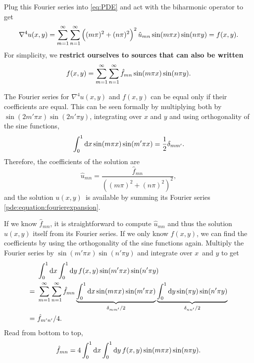 Plug this Fourier series into \cref{eq:PDE} and act with the biharmonic operator to get
\begin{equation*}
\nabla^4 u(x,y) = \sum_{m=1}^{\infty} \sum_{n=1}^{\infty} \left((m\pi)^2+(n\pi)^2\right)^2 \hat{u}_{mn} \sin(m \pi x) \sin(n \pi y) = f(x,y).
\end{equation*}
For simplicity, we \textbf{restrict ourselves to sources that can also be written}
\begin{equation}
	f(x,y) = \sum_{m=1}^{\infty} \sum_{n=1}^{\infty} \hat{f}_{mn} \sin(m \pi x) \sin(n \pi y).
\end{equation}

The Fourier series for $\nabla^4 u(x,y)$ and $f(x,y)$ can be equal only if their coefficients are equal.
This can be seen formally by multiplying both by $\sin(2m'\pi x) \sin(2n'\pi y)$, integrating over $x$ and $y$ and using orthogonality of the sine functions,
\begin{equation*}
	\integral{\sin(m\pi x) \sin(m' \pi x)}{x}{0}{1} = \frac{1}{2} \delta_{mm'}.
\end{equation*}
Therefore, the coefficients of the solution are
\begin{equation}
	\hat{u}_{mn} = \frac{\hat{f}_{mn}}{\left((m\pi)^2+(n\pi)^2\right)^2},
\end{equation}
and the solution $u(x,y)$ is available by summing its Fourier series \ref{pde:equation:fourierexpansion}.

If we know $\hat{f}_{mn}$, it is straightforward to compute $\hat{u}_{mn}$ and thus the solution $u(x,y)$ itself from its Fourier series.
If we only know $f(x,y)$, we can find the coefficients by using the orthogonality of the sine functions again.
Multiply the Fourier series by $\sin(m' \pi x) \sin(n' \pi y)$ and integrate over $x$ and $y$ to get
\begin{equation*}
\begin{split}
  & \,\, \integraltwo{f(x,y) \sin(m' \pi x) \sin(n' \pi y)}{x}{y}{0}{1}{0}{1} \\
= & \,\, \sum_{m=1}^{\infty} \sum_{n=1}^{\infty} \hat{f}_{mn} \underbrace{\integral{\sin(m\pi x)\sin(m'\pi x)}{x}{0}{1}}_{\delta_{mm'}/2} \underbrace{\integral{\sin(\pi y)\sin(n'\pi y)}{y}{0}{1}}_{\delta_{nn'}/2} \\
= & \,\, \hat{f}_{m'n'} / 4.
\end{split}
\end{equation*}
Read from bottom to top,
\begin{equation}
\hat{f}_{mn} = 4 \integraltwo{f(x,y) \sin(m \pi x) \sin(n \pi y)}{x}{y}{0}{1}{0}{1}.
\end{equation}

